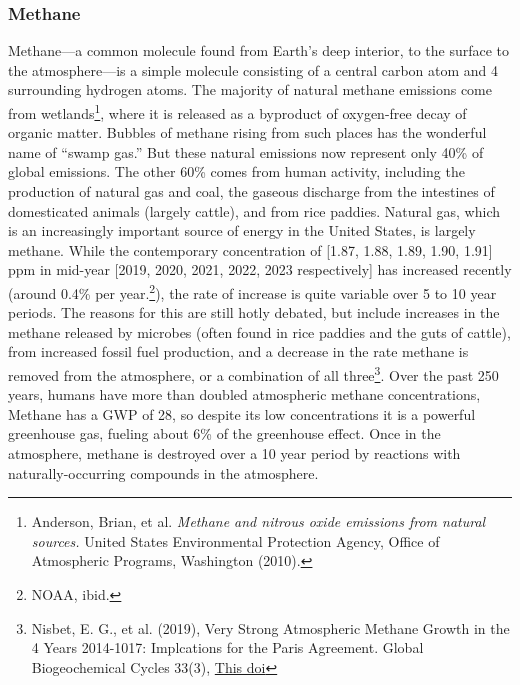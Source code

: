 \documentclass[amstex,12pt]{book}
\begin{document}
\subsubsection{Methane}
Methane---a common molecule found from Earth's deep interior, to the surface to the atmosphere---is a simple molecule consisting of a central carbon atom and 4 surrounding hydrogen atoms. The majority of natural methane emissions come from wetlands\footnote{Anderson, Brian, et al. \textit{Methane and nitrous oxide emissions from natural sources.} United States Environmental Protection Agency, Office of Atmospheric Programs, Washington (2010).}, where it is released as a byproduct of oxygen-free decay of organic matter. Bubbles of methane rising from such places has the wonderful name of ``swamp gas.'' But these natural emissions now represent only 40\% of global emissions. The other 60\% comes from human activity, including the production of natural gas and coal, the gaseous discharge from the intestines of domesticated animals (largely cattle), and from rice paddies. Natural gas, which is an increasingly important source of energy in the United States, is largely methane. While the contemporary concentration of [1.87, 1.88, 1.89, 1.90, 1.91] ppm in mid-year [2019, 2020, 2021, 2022, 2023 respectively] has increased recently (around 0.4\% per year.\footnote{NOAA, ibid.}), the rate of increase is quite variable over 5 to 10 year periods. The reasons for this are still hotly debated, but include increases  in the methane released by microbes (often found in rice paddies and the guts of cattle), from increased fossil fuel production, and a decrease in the rate methane is removed from the atmosphere, or a combination of all three\footnote{Nisbet, E. G., et al. (2019), Very Strong Atmospheric Methane Growth in the 4 Years 2014-1017: Implcations for the Paris Agreement. Global Biogeochemical Cycles 33(3), \href{http://doi.org/10.1029/2018GB006009}{This doi}}. Over the past 250 years, humans have more than doubled atmospheric methane concentrations, Methane has a GWP of 28, so despite its low concentrations it is a powerful greenhouse gas, fueling about 6\% of the greenhouse effect. Once in the atmosphere, methane is destroyed over a 10 year period by reactions with naturally-occurring compounds in the atmosphere. \\
\end{document}
